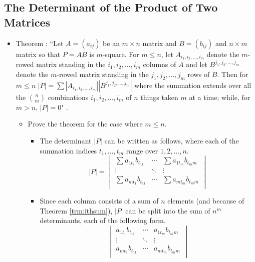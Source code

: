 \documentclass[titlepage]{article}
\newcounter{theorem}
\newcommand{\newtrm}[1]{\refstepcounter{theorem}\label{#1}Theorem \thetheorem: }
\numberwithin{figure}{section}
\numberwithin{equation}{section}
\numberwithin{theorem}{section}
\newcommand{\dq}[4][]{``#2"#1 \cite[#4]{#3}.}
\begin{document}
\subsection{The Determinant of the Product of Two Matrices}
\begin{itemize}
    \item \newtrm{trm:multconditional}\dq{Let $A=(a_{ij})$ be an $m\times n$ matrix and $B=(b_{ij})$ and $n\times m$ matrix so that $P=AB$ is $m$-square. For $m\leq n$, let $A_{i_1,i_2,\dots,i_m}$ denote the $m$-rowed matrix standing in the $i_1,i_2,\dots,i_m$ columns of $A$ and let $B^{j_1,j_2,\dots,j_m}$ denote the $m$-rowed matrix standing in the $j_1,j_2,\dots,j_m$ rows of $B$. Then for $m\leq n$ $|P|=\sum \left| A_{i_1,i_2,\dots,i_m} \right|\left| B^{j_1,j_2,\dots,j_m} \right|$ where the summation extends over all the $n\choose m$ combinations $i_1,i_2,\dots,i_m$ of $n$ things taken $m$ at a time; while, for $m>n$, $|P|=0$}{bib:determinants}{24}
    \begin{itemize}
        \item Prove the theorem for the case where $m\leq n$.
        \begin{itemize}
            \item The determinant $|P|$ can be written as follows, where each of the summation indices $t_1,\dots,t_m$ range over $1,2,\dots,n$.
            \begin{equation*}
                |P| =
                \begin{vmatrix}
                    \sum a_{1t_1}b_{t_11} & \cdots & \sum a_{1t_m}b_{t_mm}\\
                    \vdots & \ddots &\vdots\\
                    \sum a_{mt_1}b_{t_11} & \cdots & \sum a_{mt_m}b_{t_mm}\\
                \end{vmatrix}
            \end{equation*}
            \item Since each column consists of a sum of $n$ elements (and because of Theorem \ref{trm:ithsum}), $|P|$ can be split into the sum of $n^m$ determinants, each of the following form.
            \begin{equation*}
                \begin{vmatrix}
                    a_{1t_1}b_{t_11} & \cdots & a_{1t_m}b_{t_mm}\\
                    \vdots & \ddots & \vdots\\
                    a_{mt_1}b_{t_11} & \cdots & a_{mt_m}b_{t_mm}\\

\end{vmatrix}
\end{equation*}
\end{itemize}
\end{itemize}
\end{itemize}
\end{document}
